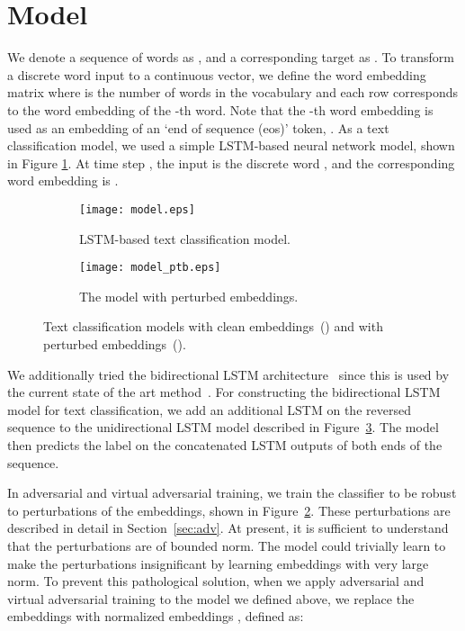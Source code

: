 \documentclass{article}
\begin{document}
\section{Model}
\label{sec:model}
We denote a sequence of  words as ,
and a corresponding target as .
To transform a discrete word input to a continuous vector, we define the
word embedding matrix  where 
is the number of words in the vocabulary and each row  corresponds to the word
embedding of the -th word.
Note that the -th word embedding is used as an embedding of an
`end of sequence (eos)' token, .
As a text classification model, we used a simple LSTM-based
neural network model, shown in Figure {\ref{fig:model}}.
At time step , the input is the discrete word ,
and the corresponding word embedding is .
\begin{figure}[ht]
\begin{subfigure}[h]{0.45\textwidth}
			\texttt{[image: model.eps]}
			\caption{\label{fig:model} LSTM-based text classification model.}
	\end{subfigure}
	\hfill
	\begin{subfigure}[h]{0.45\textwidth}
			\texttt{[image: model\_ptb.eps]}
			\caption{\label{fig:model_ptb} The model with perturbed embeddings.}
	\end{subfigure}
\caption{\label{fig:models} Text classification models with clean
	embeddings~() and with perturbed
	embeddings~().}
\end{figure}
We additionally tried the bidirectional LSTM architecture~\cite[]{graves2005framewise} since this is used by the current state of the art
method~\cite[]{johnson2016supervised}.
For constructing the bidirectional LSTM model for text classification, we add an
additional LSTM on the reversed sequence to the unidirectional LSTM model described
in Figure~\ref{fig:models}.
The model then predicts the label on the concatenated LSTM outputs of both ends of the
sequence.

In adversarial and virtual adversarial training, we train the classifier to be
robust to perturbations of the embeddings, shown in
Figure~\ref{fig:model_ptb}.
These perturbations are described in detail in Section~\ref{sec:adv}.
At present, it is sufficient to understand that the perturbations are of bounded
norm.
The model could trivially learn to make the perturbations insignificant by learning
embeddings with very large norm.
To prevent this pathological solution, when we apply adversarial and virtual adversarial training to the model
we defined above, we replace the embeddings  with normalized embeddings ,
defined as:
\end{document}

